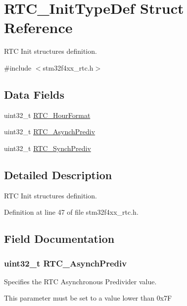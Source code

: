 \hypertarget{struct_r_t_c___init_type_def}{\section{R\-T\-C\-\_\-\-Init\-Type\-Def Struct Reference}
\label{struct_r_t_c___init_type_def}
}


R\-T\-C Init structures definition.  




{\ttfamily \#include $<$stm32f4xx\-\_\-rtc.\-h$>$}

\subsection*{Data Fields}
\begin{DoxyCompactItemize}
\item 
uint32\-\_\-t \hyperlink{struct_r_t_c___init_type_def_a0db37d58422ac673ed23f89a3f4a9112}{R\-T\-C\-\_\-\-Hour\-Format}
\item 
uint32\-\_\-t \hyperlink{struct_r_t_c___init_type_def_a4d270106e708a83f703dea7218f4f114}{R\-T\-C\-\_\-\-Asynch\-Prediv}
\item 
uint32\-\_\-t \hyperlink{struct_r_t_c___init_type_def_a241b299970511c34443ce3b13ce131ac}{R\-T\-C\-\_\-\-Synch\-Prediv}
\end{DoxyCompactItemize}


\subsection{Detailed Description}
R\-T\-C Init structures definition. 

Definition at line 47 of file stm32f4xx\-\_\-rtc.\-h.



\subsection{Field Documentation}
\hypertarget{struct_r_t_c___init_type_def_a4d270106e708a83f703dea7218f4f114}{
\subsubsection[{R\-T\-C\-\_\-\-Asynch\-Prediv}]{\setlength{\rightskip}{0pt plus 5cm}uint32\-\_\-t R\-T\-C\-\_\-\-Asynch\-Prediv}}\label{struct_r_t_c___init_type_def_a4d270106e708a83f703dea7218f4f114}
\begin{DoxyVerb} Specifies the RTC Asynchronous Predivider value.
\end{DoxyVerb}
 This parameter must be set to a value lower than 0x7\-F 

